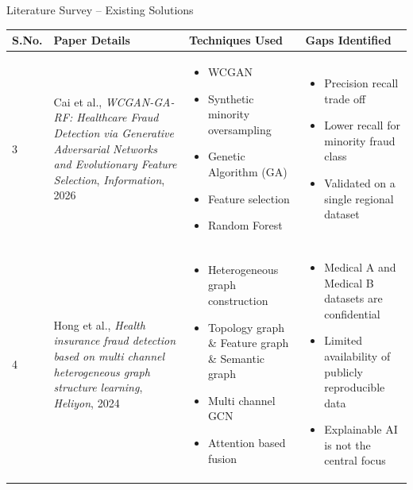 \documentclass[aspectratio=169,11pt]{beamer}
\begin{document}
\begin{frame}{Literature Survey -- Existing Solutions}
\scriptsize

\begin{tabular}{p{}p{}p{}p{}}
\toprule
\textbf{S.No.} &
\textbf{Paper Details} &
\textbf{Techniques Used} &
\textbf{Gaps Identified} \\
\midrule
3 &
Cai et al.,
\emph{WCGAN-GA-RF: Healthcare Fraud Detection via Generative Adversarial Networks and Evolutionary Feature Selection},
\emph{Information}, 2026  \cite{ref3}
&
\begin{itemize}
    \item WCGAN
    \item Synthetic minority oversampling
    \item Genetic Algorithm (GA)
    \item Feature selection
    \item Random Forest
\end{itemize}
&
\begin{itemize}
    \item Precision recall trade off
    \item Lower recall for minority fraud class
    \item Validated on a single regional dataset
\end{itemize}
\\[2mm]

4 &
Hong et al.,
\emph{Health insurance fraud detection based on multi channel heterogeneous graph structure learning},
\emph{Heliyon}, 2024  \cite{ref4}
&
\begin{itemize}
    \item Heterogeneous graph construction
    \item Topology graph \& Feature graph \& Semantic graph
    \item Multi channel GCN
    \item Attention based fusion
\end{itemize}
&
\begin{itemize}
    \item Medical A and Medical B datasets are confidential
    \item Limited availability of publicly reproducible data
    \item Explainable AI is not the central focus
   
\end{itemize}
\\[2mm]


\bottomrule
\end{tabular}
\end{frame}
\end{document}
